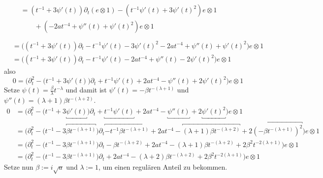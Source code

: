 \begin{try}
\begin{align*}
\\&\begin{aligned}
    &= (t^{-1} + 3\psi'(t))\partial_t (e\otimes 1)
    - (t^{-1} \psi'(t) + 3\psi'(t)^2)e\otimes 1
  \\&\qquad + (- 2at^{-4} + \psi''(t) + \psi'(t)^2) e\otimes 1
\\\end{aligned}
\\&= \Big((t^{-1} + 3\psi'(t))\partial_t
    - t^{-1} \psi'(t) - 3\psi'(t)^2 - 2at^{-4} + \psi''(t)
    + \psi'(t)^2\Big) e\otimes 1
\\&= \Big((t^{-1} + 3\psi'(t))\partial_t
    - t^{-1} \psi'(t) - 2at^{-4} + \psi''(t)
    - 2 \psi'(t)^2\Big) e\otimes 1
\end{align*}
also
\[
0 = \Big(\partial_t^2 - \big(t^{-1} + 3\psi'(t)\big)\partial_t
    + t^{-1} \psi'(t) + 2at^{-4} -\psi''(t)
    + 2 \psi'(t)^2\Big) e\otimes 1
\]
Setze $\psi(t)=\frac{\beta}{\lambda}t^{-\lambda}$ und damit ist 
$\psi'(t)=-\beta t^{-(\lambda+1)}$ und
$\psi''(t)=(\lambda+1)\beta t^{-(\lambda+2)}$.
\begin{align*}
0 &= \Big(\partial_t^2 - \big(t^{-1} + 3\underbracket{\psi'(t)}\big)\partial_t
   + \underbracket{t^{-1} \psi'(t)} + 2at^{-4} -\underbracket{\psi''(t)}
   + 2 \underbracket{\psi'(t)^2}\Big) e\otimes 1
\\&= \Big(\partial_t^2 - \big(t^{-1} 
   - 3\overbracket{\beta t^{-(\lambda+1)}}\big)\partial_t
   \overbracket{- t^{-1} \beta t^{-(\lambda+1)}} + 2at^{-4} 
   - \overbracket{(\lambda+1)\beta t^{-(\lambda+2)}}
   + 2 \overbracket{(-\beta t^{-(\lambda+1)})^2}\Big) e\otimes 1
\\&= \Big(\partial_t^2 - \big(t^{-1} - 3\beta t^{-(\lambda+1)}\big)\partial_t
   - \beta t^{-(\lambda+2)} + 2at^{-4} - (\lambda+1)\beta t^{-(\lambda+2)}
   + 2 \beta^2 t^{-2(\lambda+1)}\Big) e\otimes 1
\\&= \Big(\partial_t^2 - \big(t^{-1} - 3\beta t^{-(\lambda+1)}\big)\partial_t
   + 2at^{-4} - (\lambda+2)\beta t^{-(\lambda+2)}
   + 2 \beta^2 t^{-2(\lambda+1)}\Big) e\otimes 1
\end{align*}
Setze nun $\beta:=i\sqrt{a}$ und $\lambda:=1$, um einen regulären Anteil zu
bekommen.
\begin{comment}
TODO: $\lambda=\lambda_0$ ??
\end{comment}

\end{try}
